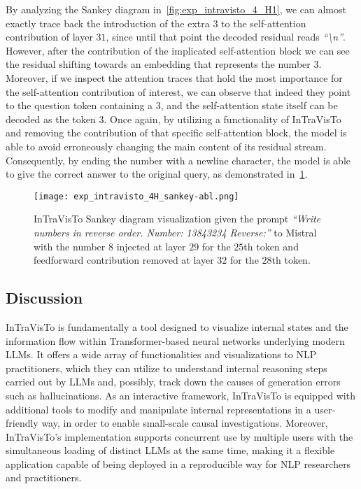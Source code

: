 By analyzing the Sankey diagram in~\cref{fig:exp_intravisto_4_H1}, we can almost exactly trace back the introduction of the extra $3$ to the self-attention contribution of layer $31$, since until that point the decoded residual reads \emph{``\textbackslash{}n''}.
However, after the contribution of the implicated self-attention block we can see the residual shifting towards an embedding that represents the number $3$.
Moreover, if we inspect the attention traces that hold the most importance for the self-attention contribution of interest, we can observe that indeed they point to the question token containing a $3$, and the self-attention state itself can be decoded as the token $3$.
Once again, by utilizing a functionality of InTraVisTo and removing the contribution of that specific self-attention block, the model is able to avoid erroneously changing the main content of its residual stream.
Consequently, by ending the number with a newline character, the model is able to give the correct answer to the original query, as demonstrated in~\cref{fig:exp_intravisto_4_H2}.

\begin{figure}[t!]
    \centering
    \texttt{[image: exp\_intravisto\_4H\_sankey-abl.png]}
    \caption[InTraVisTo Sankey diagram visualization given the prompt \emph{``Write numbers in reverse order. Number: 13843234 Reverse:''} to Mistral with injection and ablation.]{InTraVisTo Sankey diagram visualization given the prompt \emph{``Write numbers in reverse order. Number: 13843234 Reverse:''} to Mistral with the number $8$ injected at layer $29$ for the $25$th token and feedforward contribution removed at layer $32$ for the $28$th token.}
    \label{fig:exp_intravisto_4_H2}
\end{figure}

\subsection{Discussion}

InTraVisTo is fundamentally a tool designed to visualize internal states and the information flow within Transformer-based neural networks underlying modern LLMs.
It offers a wide array of functionalities and visualizations to NLP practitioners, which they can utilize to understand internal reasoning steps carried out by LLMs and, possibly, track down the causes of generation errors such as hallucinations.
As an interactive framework, InTraVisTo is equipped with additional tools to modify and manipulate internal representations in a user-friendly way, in order to enable small-scale causal investigations.
Moreover, InTraVisTo's implementation supports concurrent use by multiple users with the simultaneous loading of distinct LLMs at the same time, making it a flexible application capable of being deployed in a reproducible way for NLP researchers and practitioners.

